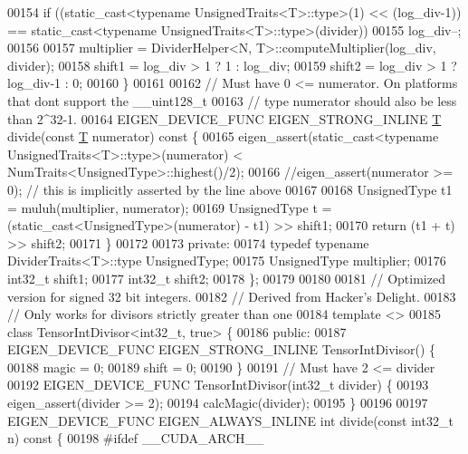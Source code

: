 \begin{DoxyCode}
00154     \textcolor{keywordflow}{if} ((\textcolor{keyword}{static\_cast<}typename UnsignedTraits<T>::type\textcolor{keyword}{>}(1) << (log\_div-1)) == \textcolor{keyword}{static\_cast<}typename 
      UnsignedTraits<T>::type\textcolor{keyword}{>}(divider))
00155       log\_div--;
00156 
00157     multiplier = DividerHelper<N, T>::computeMultiplier(log\_div, divider);
00158     shift1 = log\_div > 1 ? 1 : log\_div;
00159     shift2 = log\_div > 1 ? log\_div-1 : 0;
00160   \}
00161 
00162   \textcolor{comment}{// Must have 0 <= numerator. On platforms that dont support the \_\_uint128\_t}
00163   \textcolor{comment}{// type numerator should also be less than 2^32-1.}
00164   EIGEN\_DEVICE\_FUNC EIGEN\_STRONG\_INLINE \hyperlink{group___sparse_core___module_class_eigen_1_1_triplet}{T} divide(\textcolor{keyword}{const} \hyperlink{group___sparse_core___module_class_eigen_1_1_triplet}{T} numerator)\textcolor{keyword}{ const }\{
00165     eigen\_assert(\textcolor{keyword}{static\_cast<}typename UnsignedTraits<T>::type\textcolor{keyword}{>}(numerator) < 
      NumTraits<UnsignedType>::highest()/2);
00166     \textcolor{comment}{//eigen\_assert(numerator >= 0); // this is implicitly asserted by the line above}
00167 
00168     UnsignedType t1 = muluh(multiplier, numerator);
00169     UnsignedType t = (\textcolor{keyword}{static\_cast<}UnsignedType\textcolor{keyword}{>}(numerator) - t1) >> shift1;
00170     \textcolor{keywordflow}{return} (t1 + t) >> shift2;
00171   \}
00172 
00173  \textcolor{keyword}{private}:
00174   \textcolor{keyword}{typedef} \textcolor{keyword}{typename} DividerTraits<T>::type UnsignedType;
00175   UnsignedType multiplier;
00176   int32\_t shift1;
00177   int32\_t shift2;
00178 \};
00179 
00180 
00181 \textcolor{comment}{// Optimized version for signed 32 bit integers.}
00182 \textcolor{comment}{// Derived from Hacker's Delight.}
00183 \textcolor{comment}{// Only works for divisors strictly greater than one}
00184 \textcolor{keyword}{template} <>
00185 \textcolor{keyword}{class }TensorIntDivisor<int32\_t, true> \{
00186  \textcolor{keyword}{public}:
00187   EIGEN\_DEVICE\_FUNC EIGEN\_STRONG\_INLINE TensorIntDivisor() \{
00188     magic = 0;
00189     shift = 0;
00190   \}
00191   \textcolor{comment}{// Must have 2 <= divider}
00192   EIGEN\_DEVICE\_FUNC TensorIntDivisor(int32\_t divider)  \{
00193     eigen\_assert(divider >= 2);
00194     calcMagic(divider);
00195   \}
00196 
00197   EIGEN\_DEVICE\_FUNC EIGEN\_ALWAYS\_INLINE \textcolor{keywordtype}{int} divide(\textcolor{keyword}{const} int32\_t n)\textcolor{keyword}{ const }\{
00198 \textcolor{preprocessor}{#ifdef \_\_CUDA\_ARCH\_\_}

\end{DoxyCode}
